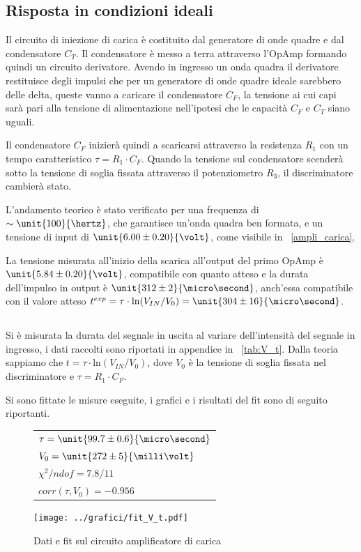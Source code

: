 \documentclass[10pt,a4paper]{article}
\begin{document}
\subsection{Risposta in condizioni ideali}
Il circuito di iniezione di carica è costituito dal generatore di onde quadre e dal condensatore $C_T$. Il condensatore è messo a terra attraverso l'OpAmp formando quindi un circuito derivatore. Avendo in ingresso un onda quadra il derivatore restituisce degli impulsi che per un generatore di onde quadre ideale sarebbero delle delta, queste vanno a caricare il condensatore $C_F$, la tensione ai cui capi sarà pari alla tensione di alimentazione nell'ipotesi che le capacità $C_F$ e $C_T$ siano uguali.

Il condensatore $C_F$ inizierà quindi a scaricarsi attraverso la resistenza $R_1$ con un tempo caratteristico $\tau = R_1 \cdot C_F$. Quando la tensione sul condensatore scenderà sotto la tensione di soglia fissata attraverso il potenziometro $R_3$, il discriminatore cambierà stato.

L'andamento teorico è stato verificato per una frequenza di $\sim \unit{100}{\hertz}$, che garantisce un'onda quadra ben formata, e un tensione di input di $\unit{6.00 \pm 0.20}{\volt}$, come visibile in \figurename{~\ref{ampli_carica}}. 

La tensione misurata all'inizio della scarica all'output del primo OpAmp è $\unit{5.84 \pm 0.20}{\volt}$, compatibile con quanto atteso e la durata dell'impulso in output è $\unit{312 \pm 2}{\micro\second}$, anch'essa compatibile con il valore atteso $t^{exp} = \tau \cdot \text{ln}(V_{IN}/V_0) = \unit{304 \pm 16}{\micro\second}$.

\subsection{}
Si è misurata la durata del segnale in uscita al variare dell'intensità del segnale in ingresso, i dati raccolti sono riportati in appendice in \tablename{~\ref{tab:V_t}}.
Dalla teoria sappiamo che $t = \tau \cdot \text{ln}(V_{IN}/V_0)$, dove $V_0$ è la tensione di soglia fissata nel discriminatore e $\tau = R_1 \cdot C_F$.

Si sono fittate le misure eseguite, i grafici e i risultati del fit sono di seguito riportanti.

\begin{figure}[H]
	\begin{minipage}{0.28\textwidth}
		\centering
		\begin{tabular}{l}
			$\tau = \unit{99.7 \pm 0.6}{\micro\second}$ \\
			$V_0 = \unit{272 \pm 5}{\milli \volt}$ \\
			$\chi^2 / ndof = 7.8/11$\\
			$corr(\tau,V_0) = -0.956$\\
		\end{tabular}
	\end{minipage}
	\begin{minipage}{0.75\textwidth}
		\centering
		\texttt{[image: ../grafici/fit\_V\_t.pdf]}
		\caption{Dati e fit sul circuito amplificatore di carica}
		\label{}
	\end{minipage}
\end{figure}
\end{document}
